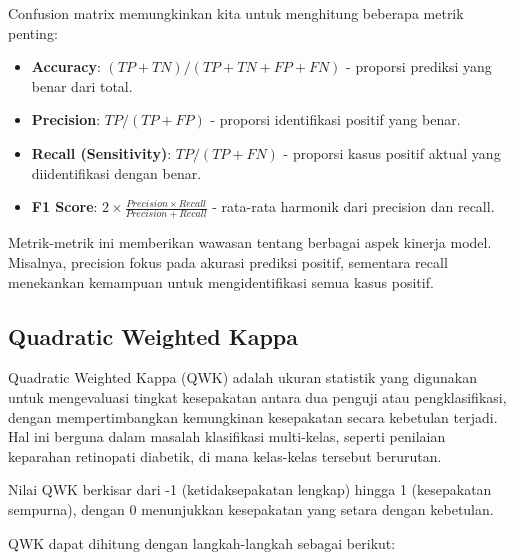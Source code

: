 Confusion matrix memungkinkan kita untuk menghitung beberapa metrik penting:

\begin{itemize}
    \item \textbf{Accuracy}: $(TP + TN) / (TP + TN + FP + FN)$ - proporsi prediksi yang benar dari total.
    \item \textbf{Precision}: $TP / (TP + FP)$ - proporsi identifikasi positif yang benar.
    \item \textbf{Recall (Sensitivity)}: $TP / (TP + FN)$ - proporsi kasus positif aktual yang diidentifikasi dengan benar.
    \item \textbf{F1 Score}: $2 \times \frac{Precision \times Recall}{Precision + Recall}$ - rata-rata harmonik dari precision dan recall.
\end{itemize}

Metrik-metrik ini memberikan wawasan tentang berbagai aspek kinerja model. Misalnya, precision fokus pada akurasi prediksi positif, sementara recall menekankan kemampuan untuk mengidentifikasi semua kasus positif.

\subsection{Quadratic Weighted Kappa}

Quadratic Weighted Kappa (QWK) adalah ukuran statistik yang digunakan untuk mengevaluasi tingkat kesepakatan antara dua penguji atau pengklasifikasi, dengan mempertimbangkan kemungkinan kesepakatan secara kebetulan terjadi. Hal ini berguna dalam masalah klasifikasi multi-kelas, seperti penilaian keparahan retinopati diabetik, di mana kelas-kelas tersebut berurutan.

Nilai QWK berkisar dari -1 (ketidaksepakatan lengkap) hingga 1 (kesepakatan sempurna), dengan 0 menunjukkan kesepakatan yang setara dengan kebetulan.

QWK dapat dihitung dengan langkah-langkah sebagai berikut:


